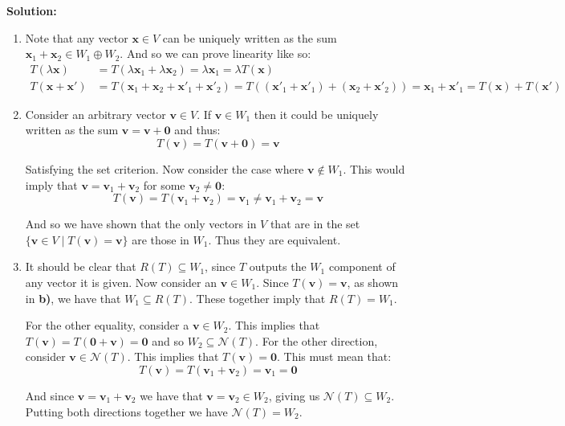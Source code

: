 \documentclass{article}
\renewcommand\vec{\mathbf}
\begin{document}
\noindent\textbf{Solution:} 
\begin{enumerate}[label=\textbf{\alph*)}]
  \item Note that any vector $\vec x\in V$ can be uniquely written as the sum $\vec x_1+\vec x_2\in W_1\oplus W_2$. And so we can prove linearity like so:
  \begin{align*}
    T(\lambda\vec x)&=T(\lambda\vec x_1+\lambda\vec x_2)=\lambda\vec x_1=\lambda T(\vec x)\\
    T(\vec x+\vec x')&=T(\vec x_1+\vec x_2+\vec x'_1+\vec x'_2)=T((\vec x'_1+\vec x'_1)+(\vec x_2+\vec x'_2))=\vec x_1+\vec x'_1=T(\vec x)+T(\vec x')
  \end{align*}
  \item Consider an arbitrary vector $\vec v\in V$. If $\vec v\in W_1$ then it could be uniquely written as the sum $\vec v=\vec v+\vec 0$ and thus:
  $$T(\vec v)=T(\vec v+\vec 0)=\vec v$$
  
  Satisfying the set criterion. Now consider the case where $\vec v\not\in W_1$. This would imply that $\vec v=\vec v_1+\vec v_2$ for some $\vec v_2\not=\vec 0$:
  $$T(\vec v)=T(\vec v_1+\vec v_2)=\vec v_1\not=\vec v_1+\vec v_2=\vec v$$
  
  And so we have shown that the only vectors in $V$ that are in the set $\{\vec v\in V\mid T(\vec v) = \vec v\}$ are those in $W_1$. Thus they are equivalent.
  \item It should be clear that $R(T)\subseteq W_1$, since $T$ outputs the $W_1$ component of any vector it is given. Now consider an $\vec v\in W_1$. Since $T(\vec v)=\vec v$, as shown in \textbf{b)}, we have that $W_1\subseteq R(T)$. These together imply that $R(T)=W_1$.

  For the other equality, consider a $\vec v\in W_2$. This implies that $T(\vec v)=T(\vec0+\vec v)=\vec 0$ and so $W_2\subseteq\mathcal N(T)$. For the other direction, consider $\vec v\in\mathcal N(T)$. This implies that $T(\vec v)=\vec 0$. This must mean that:
  $$T(\vec v)=T(\vec v_1+\vec v_2)=\vec v_1=\vec 0$$
  
  And since $\vec v=\vec v_1+\vec v_2$ we have that $\vec v=\vec v_2\in W_2$, giving us $\mathcal N(T)\subseteq W_2$. Putting both directions together we have $\mathcal N(T)=W_2$.
\end{enumerate}
\end{document}
